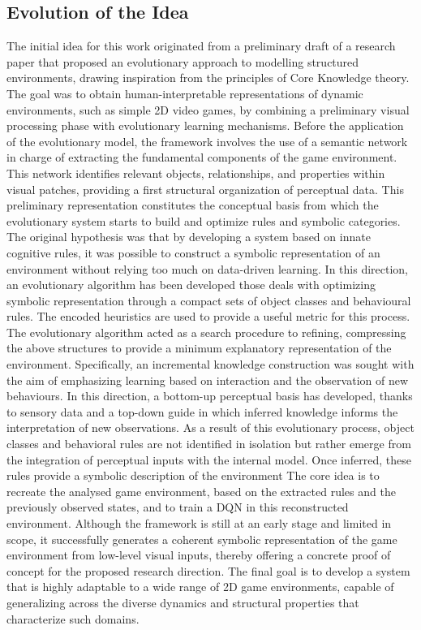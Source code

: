\documentclass[12pt,a4paper]{report}
\begin{document}
\subsection{Evolution of the Idea}
The initial idea for this work originated from a preliminary draft of a research paper that proposed an evolutionary approach to modelling structured environments, drawing inspiration from the principles of Core Knowledge theory. The goal was to obtain human-interpretable representations of dynamic environments, such as simple 2D video games, by combining a preliminary visual processing phase with evolutionary learning mechanisms.
Before the application of the evolutionary model, the framework involves the use of a semantic network in charge of extracting the fundamental components of the game environment. This network identifies relevant objects, relationships, and properties within visual patches, providing a first structural organization of perceptual data. This preliminary representation constitutes the conceptual basis from which the evolutionary system starts to build and optimize rules and symbolic categories.
The original hypothesis was that by developing a system based on innate cognitive rules, it was possible to construct a symbolic representation of an environment without relying too much on data-driven learning. In this direction, an evolutionary algorithm has been developed those deals with optimizing symbolic representation through a compact sets of object classes and behavioural rules.  The encoded heuristics are used to provide a useful metric for this process. 
The evolutionary algorithm acted as a search procedure to refining, compressing the above structures to provide a minimum explanatory representation of the environment. Specifically, an incremental knowledge construction was sought with the aim of emphasizing learning based on interaction and the observation of new behaviours. In this direction, a bottom-up perceptual basis has developed, thanks to sensory data and a top-down guide in which inferred knowledge informs the interpretation of new observations. As a result of this evolutionary process, object classes and behavioral rules are not identified in isolation but rather emerge from the integration of perceptual inputs with the internal model. Once inferred, these rules provide a symbolic description of the environment
The core idea is to recreate the analysed game environment, based on the extracted rules and the previously observed states, and to train a DQN in this reconstructed environment.
Although the framework is still at an early stage and limited in scope, it successfully generates a coherent symbolic representation of the game environment from low-level visual inputs, thereby offering a concrete proof of concept for the proposed research direction.
The final goal is to develop a system that is highly adaptable to a wide range of 2D game environments, capable of generalizing across the diverse dynamics and structural properties that characterize such domains.
\end{document}
